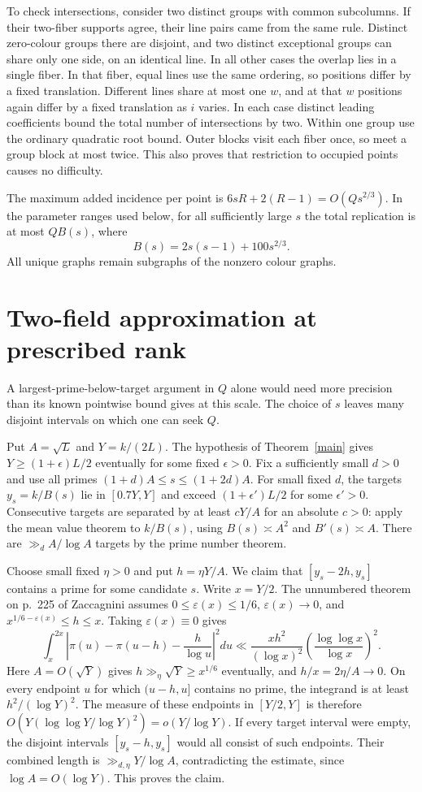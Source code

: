 \documentclass[10pt]{article}
\begin{document}
To check intersections, consider two distinct groups with common subcolumns. If their two-fiber supports agree, their line pairs came from the same rule. Distinct zero-colour groups there are disjoint, and two distinct exceptional groups can share only one side, on an identical line. In all other cases the overlap lies in a single fiber. In that fiber, equal lines use the same ordering, so positions differ by a fixed translation. Different lines share at most one $w$, and at that $w$ positions again differ by a fixed translation as $i$ varies. In each case distinct leading coefficients bound the total number of intersections by two. Within one group use the ordinary quadratic root bound. Outer blocks visit each fiber once, so meet a group block at most twice. This also proves that restriction to occupied points causes no difficulty.

The maximum added incidence per point is $6sR+2(R-1)=O(Qs^{2/3})$. In the parameter ranges used below, for all sufficiently large $s$ the total replication is at most $QB(s)$, where
\[
 B(s)=2s(s-1)+100s^{2/3}.
\]
All unique graphs remain subgraphs of the nonzero colour graphs.

\section{Two-field approximation at prescribed rank}
A largest-prime-below-target argument in $Q$ alone would need more precision than its known pointwise bound gives at this scale. The choice of $s$ leaves many disjoint intervals on which one can seek $Q$.

Put $A=\sqrt L$ and $Y=k/(2L)$. The hypothesis of Theorem~\ref{main} gives $Y\ge(1+\epsilon)L/2$ eventually for some fixed $\epsilon>0$. Fix a sufficiently small $d>0$ and use all primes $(1+d)A\le s\le(1+2d)A$. For small fixed $d$, the targets $y_s=k/B(s)$ lie in $[0.7Y,Y]$ and exceed $(1+\epsilon')L/2$ for some $\epsilon'>0$. Consecutive targets are separated by at least $cY/A$ for an absolute $c>0$: apply the mean value theorem to $k/B(s)$, using $B(s)\asymp A^2$ and $B'(s)\asymp A$. There are $\gg_d A/\log A$ targets by the prime number theorem.

Choose small fixed $\eta>0$ and put $h=\eta Y/A$. We claim that $[y_s-2h,y_s]$ contains a prime for some candidate $s$. Write $x=Y/2$. The unnumbered theorem on p.~225 of Zaccagnini \cite{zacc} assumes $0\le\varepsilon(x)\le1/6$, $\varepsilon(x)\to0$, and $x^{1/6-\varepsilon(x)}\le h\le x$. Taking $\varepsilon(x)\equiv0$ gives
\[
 \int_x^{2x}\left|\pi(u)-\pi(u-h)-\frac{h}{\log u}\right|^2du
 \ll \frac{xh^2}{(\log x)^2}
       \left(\frac{\log\log x}{\log x}\right)^2 .
\]
Here $A=O(\sqrt Y)$ gives $h\gg_\eta\sqrt Y\ge x^{1/6}$ eventually, and $h/x=2\eta/A\to0$. On every endpoint $u$ for which $(u-h,u]$ contains no prime, the integrand is at least $h^2/(\log Y)^2$. The measure of these endpoints in $[Y/2,Y]$ is therefore $O(Y(\log\log Y/\log Y)^2)=o(Y/\log Y)$. If every target interval were empty, the disjoint intervals $[y_s-h,y_s]$ would all consist of such endpoints. Their combined length is $\gg_{d,\eta}Y/\log A$, contradicting the estimate, since $\log A=O(\log Y)$. This proves the claim.
\end{document}

